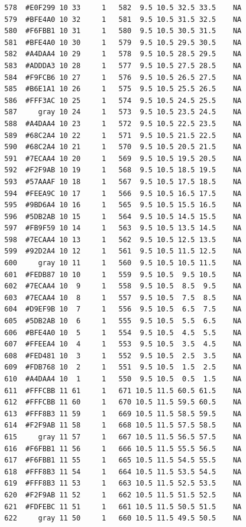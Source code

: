 \documentclass[12pt,twoside]{reedthesis}
\begin{document}
\begin{verbatim}
  578  #E0F299 10 33     1   582  9.5 10.5 32.5 33.5    NA
  579  #BFE4A0 10 32     1   581  9.5 10.5 31.5 32.5    NA
  580  #F6FBB1 10 31     1   580  9.5 10.5 30.5 31.5    NA
  581  #BFE4A0 10 30     1   579  9.5 10.5 29.5 30.5    NA
  582  #A4DAA4 10 29     1   578  9.5 10.5 28.5 29.5    NA
  583  #ADDDA3 10 28     1   577  9.5 10.5 27.5 28.5    NA
  584  #F9FCB6 10 27     1   576  9.5 10.5 26.5 27.5    NA
  585  #B6E1A1 10 26     1   575  9.5 10.5 25.5 26.5    NA
  586  #FFF3AC 10 25     1   574  9.5 10.5 24.5 25.5    NA
  587     gray 10 24     1   573  9.5 10.5 23.5 24.5    NA
  588  #A4DAA4 10 23     1   572  9.5 10.5 22.5 23.5    NA
  589  #68C2A4 10 22     1   571  9.5 10.5 21.5 22.5    NA
  590  #68C2A4 10 21     1   570  9.5 10.5 20.5 21.5    NA
  591  #7ECAA4 10 20     1   569  9.5 10.5 19.5 20.5    NA
  592  #F2F9AB 10 19     1   568  9.5 10.5 18.5 19.5    NA
  593  #57AAAF 10 18     1   567  9.5 10.5 17.5 18.5    NA
  594  #FEEA9C 10 17     1   566  9.5 10.5 16.5 17.5    NA
  595  #9BD6A4 10 16     1   565  9.5 10.5 15.5 16.5    NA
  596  #5DB2AB 10 15     1   564  9.5 10.5 14.5 15.5    NA
  597  #FB9F59 10 14     1   563  9.5 10.5 13.5 14.5    NA
  598  #7ECAA4 10 13     1   562  9.5 10.5 12.5 13.5    NA
  599  #92D2A4 10 12     1   561  9.5 10.5 11.5 12.5    NA
  600     gray 10 11     1   560  9.5 10.5 10.5 11.5    NA
  601  #FEDB87 10 10     1   559  9.5 10.5  9.5 10.5    NA
  602  #7ECAA4 10  9     1   558  9.5 10.5  8.5  9.5    NA
  603  #7ECAA4 10  8     1   557  9.5 10.5  7.5  8.5    NA
  604  #D9EF9B 10  7     1   556  9.5 10.5  6.5  7.5    NA
  605  #5DB2AB 10  6     1   555  9.5 10.5  5.5  6.5    NA
  606  #BFE4A0 10  5     1   554  9.5 10.5  4.5  5.5    NA
  607  #FFEEA4 10  4     1   553  9.5 10.5  3.5  4.5    NA
  608  #FED481 10  3     1   552  9.5 10.5  2.5  3.5    NA
  609  #FDB768 10  2     1   551  9.5 10.5  1.5  2.5    NA
  610  #A4DAA4 10  1     1   550  9.5 10.5  0.5  1.5    NA
  611  #FFFCBB 11 61     1   671 10.5 11.5 60.5 61.5    NA
  612  #FFFCBB 11 60     1   670 10.5 11.5 59.5 60.5    NA
  613  #FFF8B3 11 59     1   669 10.5 11.5 58.5 59.5    NA
  614  #F2F9AB 11 58     1   668 10.5 11.5 57.5 58.5    NA
  615     gray 11 57     1   667 10.5 11.5 56.5 57.5    NA
  616  #F6FBB1 11 56     1   666 10.5 11.5 55.5 56.5    NA
  617  #F6FBB1 11 55     1   665 10.5 11.5 54.5 55.5    NA
  618  #FFF8B3 11 54     1   664 10.5 11.5 53.5 54.5    NA
  619  #FFF8B3 11 53     1   663 10.5 11.5 52.5 53.5    NA
  620  #F2F9AB 11 52     1   662 10.5 11.5 51.5 52.5    NA
  621  #FDFEBC 11 51     1   661 10.5 11.5 50.5 51.5    NA
  622     gray 11 50     1   660 10.5 11.5 49.5 50.5    NA

\end{verbatim}
\end{document}
